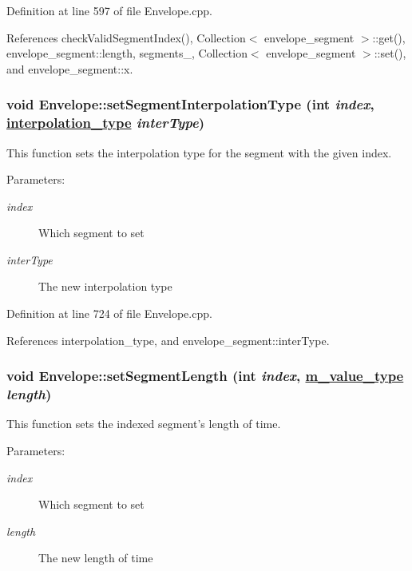 Definition at line 597 of file Envelope.cpp.

References check\-Valid\-Segment\-Index(), Collection$<$ envelope\_\-segment $>$::get(), envelope\_\-segment::length, segments\_\-, Collection$<$ envelope\_\-segment $>$::set(), and envelope\_\-segment::x.\hypertarget{classEnvelope_a25}{
\subsubsection[setSegmentInterpolationType]{\setlength{\rightskip}{0pt plus 5cm}void Envelope::set\-Segment\-Interpolation\-Type (int {\em index}, \hyperlink{Types_8h_a13}{interpolation\_\-type} {\em inter\-Type})}}
\label{classEnvelope_a25}


This function sets the interpolation type for the segment with the given index. \begin{Desc}
\item[Parameters:]
\begin{description}
\item[{\em index}]Which segment to set \item[{\em inter\-Type}]The new interpolation type \end{description}
\end{Desc}


Definition at line 724 of file Envelope.cpp.

References interpolation\_\-type, and envelope\_\-segment::inter\-Type.\hypertarget{classEnvelope_a21}{
\subsubsection[setSegmentLength]{\setlength{\rightskip}{0pt plus 5cm}void Envelope::set\-Segment\-Length (int {\em index}, \hyperlink{Types_8h_a3}{m\_\-value\_\-type} {\em length})}}
\label{classEnvelope_a21}


This function sets the indexed segment's length of time. \begin{Desc}
\item[Parameters:]
\begin{description}
\item[{\em index}]Which segment to set \item[{\em length}]The new length of time \end{description}
\end{Desc}


